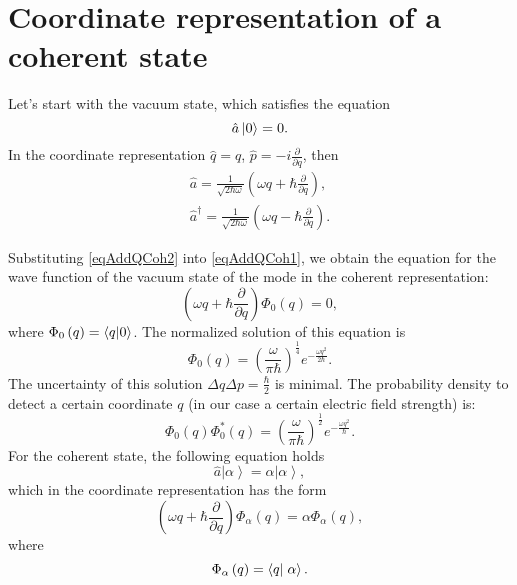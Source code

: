 \section{Coordinate representation of a coherent state}
\label{AddQCoh}
Let's start with the vacuum state, which satisfies the equation
\begin{equation}
\hat{a}\ket{0} = 0.
\label{eqAddQCoh1}
\end{equation}
In the coordinate representation $\hat{q} = q$, $\hat{p} = -i
\frac{\partial}{\partial q}$, then
\begin{eqnarray}
\hat{a} = \frac{1}{\sqrt{2 \hbar \omega}}
\left(
\omega q + \hbar \frac{\partial}{\partial q}
\right),
\nonumber \\
\hat{a}^{\dag} = \frac{1}{\sqrt{2 \hbar \omega}}
\left(
\omega q - \hbar \frac{\partial}{\partial q}
\right).
\label{eqAddQCoh2}
\end{eqnarray}

Substituting \eqref{eqAddQCoh2} into \eqref{eqAddQCoh1}, we obtain the equation
for the wave function of the vacuum state of the mode in the coherent
representation:
\begin{equation}
\left(
\omega q + \hbar \frac{\partial}{\partial q}
\right) \Phi_0\left(q\right) = 0,
\label{eqAddQCoh3}
\end{equation}
where $\Phi_0\left(q\right) = \bra{q}\ket{0}$.
The normalized solution of this equation is
\begin{equation}
\Phi_0\left(q\right) = \left(\frac{\omega}{\pi
  \hbar}\right)^{\frac{1}{4}} e^{-\frac{\omega q^2}{2 \hbar}}.
\nonumber
\end{equation}
The uncertainty of this solution $\Delta q \Delta p =
\frac{\hbar}{2}$ is minimal. The probability density to detect
a certain coordinate $q$ (in our case a certain electric field strength) is:
\begin{equation}
\Phi_0\left(q\right)\Phi_0^{*}\left(q\right) = \left(\frac{\omega}{\pi
  \hbar}\right)^{\frac{1}{2}} e^{-\frac{\omega q^2}{\hbar}}.
\label{eqAddQCoh4}
\end{equation}
For the coherent state, the following equation holds
\[
\hat{a}\left|\alpha\right> = \alpha \left|\alpha\right>,
\]
which in the coordinate representation has the form
\begin{equation}
\left(
\omega q + \hbar \frac{\partial}{\partial q}
\right) \Phi_{\alpha}\left(q\right) = 
\alpha \Phi_{\alpha}\left(q\right),
\label{eqAddQCoh5}
\end{equation}
where 
\[
\Phi_{\alpha}\left(q\right) = \bra{q}\left.\alpha\right>.
\]

